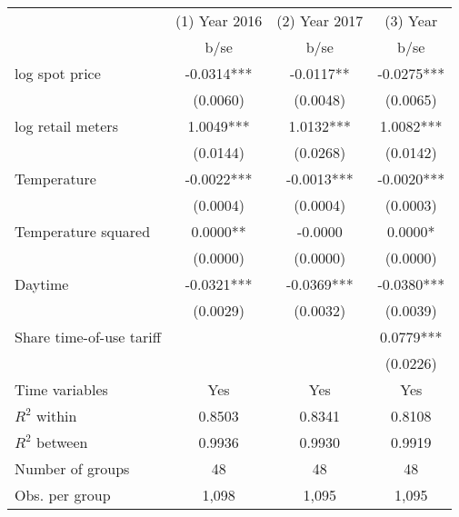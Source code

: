 \begin{tabular}{lccc}\toprule
                    &(1) Year 2016   &(2) Year 2017   &   (3) Year    \\
                    &        b/se   &        b/se   &        b/se   \\
\midrule
log spot price      &     -0.0314***&     -0.0117** &     -0.0275***\\
                    &    (0.0060)   &    (0.0048)   &    (0.0065)   \\
log retail meters   &      1.0049***&      1.0132***&      1.0082***\\
                    &    (0.0144)   &    (0.0268)   &    (0.0142)   \\
Temperature         &     -0.0022***&     -0.0013***&     -0.0020***\\
                    &    (0.0004)   &    (0.0004)   &    (0.0003)   \\
Temperature squared &      0.0000** &     -0.0000   &      0.0000*  \\
                    &    (0.0000)   &    (0.0000)   &    (0.0000)   \\
Daytime             &     -0.0321***&     -0.0369***&     -0.0380***\\
                    &    (0.0029)   &    (0.0032)   &    (0.0039)   \\
Share time-of-use tariff&               &               &      0.0779***\\
                    &               &               &    (0.0226)   \\
Time variables      &         Yes   &         Yes   &         Yes   \\
\midrule
\(R^2\) within      &      0.8503   &      0.8341   &      0.8108   \\
\(R^2\) between     &      0.9936   &      0.9930   &      0.9919   \\
Number of groups    &          48   &          48   &          48   \\
Obs. per group      &       1,098   &       1,095   &       1,095   \\
\bottomrule\end{tabular}
